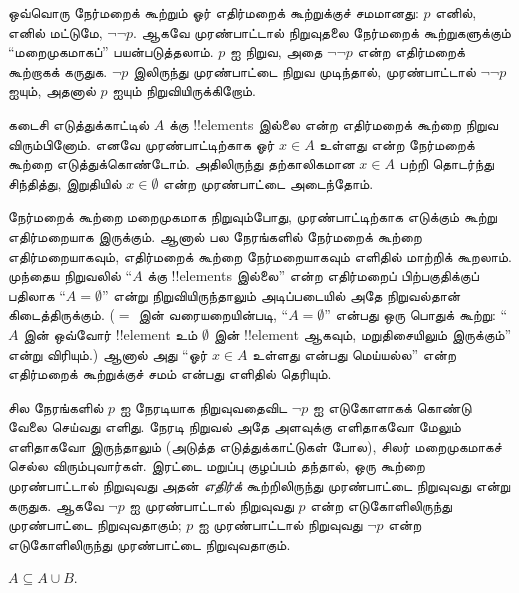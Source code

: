 \documentclass[../../../include/open-logic-section]{subfiles}
\begin{document}
ஒவ்வொரு நேர்மறைக் கூற்றும் ஓர் எதிர்மறைக் கூற்றுக்குச்
சமமானது: $p$ எனில், எனில் மட்டுமே, $\lnot\lnot p$.
ஆகவே முரண்பாட்டால் நிறுவுதலை நேர்மறைக் கூற்றுகளுக்கும்
``மறைமுகமாகப்'' பயன்படுத்தலாம். $p$ ஐ நிறுவ,
அதை $\lnot\lnot p$ என்ற எதிர்மறைக் கூற்றாகக்
கருதுக. $\lnot p$ இலிருந்து முரண்பாட்டை நிறுவ
முடிந்தால், முரண்பாட்டால் $\lnot\lnot p$ ஐயும்,
அதனால் $p$ ஐயும் நிறுவியிருக்கிறோம்.

கடைசி எடுத்துக்காட்டில் $A$ க்கு !!{element}s இல்லை
என்ற எதிர்மறைக் கூற்றை நிறுவ விரும்பினோம். எனவே
முரண்பாட்டிற்காக ஓர் $x \in A$ உள்ளது என்ற
நேர்மறைக் கூற்றை எடுத்துக்கொண்டோம். அதிலிருந்து
தற்காலிகமான $x \in A$ பற்றி தொடர்ந்து சிந்தித்து,
இறுதியில் $x \in \emptyset$ என்ற முரண்பாட்டை
அடைந்தோம்.

நேர்மறைக் கூற்றை மறைமுகமாக நிறுவும்போது, முரண்பாட்டிற்காக
எடுக்கும் கூற்று எதிர்மறையாக இருக்கும். ஆனால் பல
நேரங்களில் நேர்மறைக் கூற்றை எதிர்மறையாகவும்,
எதிர்மறைக் கூற்றை நேர்மறையாகவும் எளிதில் மாற்றிக்
கூறலாம். முந்தைய நிறுவலில் ``$A$ க்கு
!!{element}s இல்லை'' என்ற எதிர்மறைப் பிற்பகுதிக்குப்
பதிலாக ``$A = \emptyset$'' என்று நிறுவியிருந்தாலும்
அடிப்படையில் அதே நிறுவல்தான் கிடைத்திருக்கும்.
($=$ இன் வரையறையின்படி, ``$A = \emptyset$'' என்பது
ஒரு பொதுக் கூற்று: ``$A$ இன் ஒவ்வோர் !!{element}
உம் $\emptyset$ இன் !!{element} ஆகவும், மறுதிசையிலும்
இருக்கும்'' என்று விரியும்.) ஆனால் அது ``ஓர்
$x \in A$ உள்ளது என்பது மெய்யல்ல'' என்ற
எதிர்மறைக் கூற்றுக்குச் சமம் என்பது எளிதில் தெரியும்.

சில நேரங்களில் $p$ ஐ நேரடியாக நிறுவுவதைவிட
$\lnot p$ ஐ எடுகோளாகக் கொண்டு வேலை செய்வது
எளிது. நேரடி நிறுவல் அதே அளவுக்கு எளிதாகவோ
மேலும் எளிதாகவோ இருந்தாலும் (அடுத்த எடுத்துக்காட்டுகள்
போல), சிலர் மறைமுகமாகச் செல்ல விரும்புவார்கள்.
இரட்டை மறுப்பு குழப்பம் தந்தால், ஒரு கூற்றை
முரண்பாட்டால் நிறுவுவது அதன் \emph{எதிர்க்} கூற்றிலிருந்து
முரண்பாட்டை நிறுவுவது என்று கருதுக. ஆகவே $\lnot p$
ஐ முரண்பாட்டால் நிறுவுவது $p$ என்ற எடுகோளிலிருந்து
முரண்பாட்டை நிறுவுவதாகும்; $p$ ஐ முரண்பாட்டால்
நிறுவுவது $\lnot p$ என்ற எடுகோளிலிருந்து
முரண்பாட்டை நிறுவுவதாகும்.

\begin{prop}
$A \subseteq A \cup B$.
\end{prop}
\end{document}
